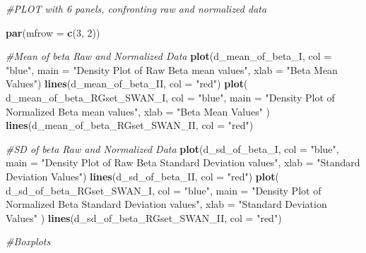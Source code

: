 \documentclass[
]{article}
\newenvironment{Shaded}{\begin{snugshade}}{\end{snugshade}}
\newcommand{\AttributeTok}[1]{\textcolor[rgb]{0.13,0.29,0.53}{#1}}
\newcommand{\CommentTok}[1]{\textcolor[rgb]{0.56,0.35,0.01}{\textit{#1}}}
\newcommand{\DecValTok}[1]{\textcolor[rgb]{0.00,0.00,0.81}{#1}}
\newcommand{\FunctionTok}[1]{\textcolor[rgb]{0.13,0.29,0.53}{\textbf{#1}}}
\newcommand{\NormalTok}[1]{#1}
\newcommand{\StringTok}[1]{\textcolor[rgb]{0.31,0.60,0.02}{#1}}
\begin{document}
\begin{Shaded}
\begin{Highlighting}[]
\CommentTok{\#PLOT with 6 panels, confronting raw and normalized data}

\FunctionTok{par}\NormalTok{(}\AttributeTok{mfrow =} \FunctionTok{c}\NormalTok{(}\DecValTok{3}\NormalTok{, }\DecValTok{2}\NormalTok{))}

\CommentTok{\#Mean of beta Raw and Normalized Data}
\FunctionTok{plot}\NormalTok{(d\_mean\_of\_beta\_I,}
     \AttributeTok{col =} \StringTok{"blue"}\NormalTok{,}
     \AttributeTok{main =} \StringTok{"Density Plot of Raw Beta mean values"}\NormalTok{,}
     \AttributeTok{xlab =} \StringTok{"Beta Mean Values"}\NormalTok{)}
\FunctionTok{lines}\NormalTok{(d\_mean\_of\_beta\_II, }\AttributeTok{col =} \StringTok{"red"}\NormalTok{)}
\FunctionTok{plot}\NormalTok{(}
\NormalTok{  d\_mean\_of\_beta\_RGset\_SWAN\_I,}
  \AttributeTok{col =} \StringTok{"blue"}\NormalTok{,}
  \AttributeTok{main =} \StringTok{"Density Plot of Normalized Beta mean values"}\NormalTok{,}
  \AttributeTok{xlab =} \StringTok{"Beta Mean Values"}
\NormalTok{)}
\FunctionTok{lines}\NormalTok{(d\_mean\_of\_beta\_RGset\_SWAN\_II, }\AttributeTok{col =} \StringTok{"red"}\NormalTok{)}

\CommentTok{\#SD of beta Raw and Normalized Data}
\FunctionTok{plot}\NormalTok{(d\_sd\_of\_beta\_I,}
     \AttributeTok{col =} \StringTok{"blue"}\NormalTok{,}
     \AttributeTok{main =} \StringTok{"Density Plot of Raw Beta Standard Deviation values"}\NormalTok{,}
     \AttributeTok{xlab =} \StringTok{"Standard Deviation Values"}\NormalTok{)}
\FunctionTok{lines}\NormalTok{(d\_sd\_of\_beta\_II, }\AttributeTok{col =} \StringTok{"red"}\NormalTok{)}
\FunctionTok{plot}\NormalTok{(}
\NormalTok{  d\_sd\_of\_beta\_RGset\_SWAN\_I,}
  \AttributeTok{col =} \StringTok{"blue"}\NormalTok{,}
  \AttributeTok{main =} \StringTok{"Density Plot of Normalized Beta Standard Deviation values"}\NormalTok{,}
  \AttributeTok{xlab =} \StringTok{"Standard Deviation Values"}
\NormalTok{)}
\FunctionTok{lines}\NormalTok{(d\_sd\_of\_beta\_RGset\_SWAN\_II, }\AttributeTok{col =} \StringTok{"red"}\NormalTok{)}

\CommentTok{\#Boxplots}


\end{Highlighting}
\end{Shaded}
\end{document}
